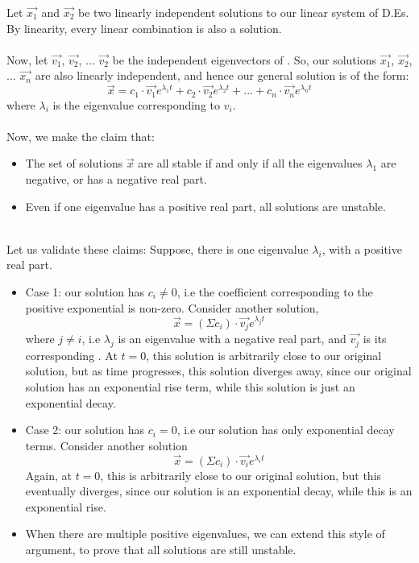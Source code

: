 \documentclass{article}
\begin{document}
Let $\overrightarrow{x_1}$ and $\overrightarrow{x_2}$ be two linearly independent solutions to our linear system of D.Es. By linearity, every linear combination is also a solution. 
\\
\\
Now, let $\overrightarrow{v_1}$, $\overrightarrow{v_2}$, ... $\overrightarrow{v_2}$ be the independent eigenvectors of . So, our solutions $\overrightarrow{x_1}$, $\overrightarrow{x_2}$, ... $\overrightarrow{x_n}$ are also linearly independent, and hence our general solution is of the form:
$$\overrightarrow{x} = c_1 \cdot \overrightarrow{v_1}  e^{\lambda_1 t} + c_2 \cdot \overrightarrow{v_2} e^{\lambda_2 t} + ... + c_n \cdot \overrightarrow{v_n} e^{\lambda_n t}$$
where $\lambda_i$ is the eigenvalue corresponding to $v_i$.
\\
\\
Now, we make the claim that:
\begin{itemize}
    \item The set of solutions $\overrightarrow{x}$ are all stable if and only if all the eigenvalues $\lambda_1$ are negative, or has a negative real part.
    \item Even if one eigenvalue has a positive real part, all solutions are unstable.
\end{itemize}
\\Let us validate these claims:
Suppose, there is one eigenvalue $\lambda_i$, with a positive real part.
\begin{itemize}
    \item Case 1: our solution has $c_i \neq 0$, i.e the coefficient corresponding to the positive exponential is non-zero.
    Consider another solution, 
    $$\overrightarrow{x} = \left (\Sigma{c_i} \right) \cdot \overrightarrow{v_j} e^{\lambda_j t}$$
    where $j \neq i$, i.e $\lambda_j$ is an eigenvalue with a negative real part, and $\overrightarrow{v_j}$ is its corresponding . At $t = 0$, this solution is arbitrarily close to our original solution, but as time progresses, this solution diverges away, since our original solution has an exponential rise term, while this solution is just an exponential decay.
    \item Case 2: our solution has $c_i = 0$, i.e our solution has only exponential decay terms. Consider another solution 
    $$\overrightarrow{x} = \left( \Sigma{c_i} \right) \cdot \overrightarrow{v_i} e^{\lambda_i t}$$
    Again, at $t = 0$, this is arbitrarily close to our original solution, but this eventually diverges, since our solution is an exponential decay, while this is an exponential rise.
    \item When there are multiple positive eigenvalues, we can extend this style of argument, to prove that all solutions are still unstable.
\end{itemize}
\end{document}
